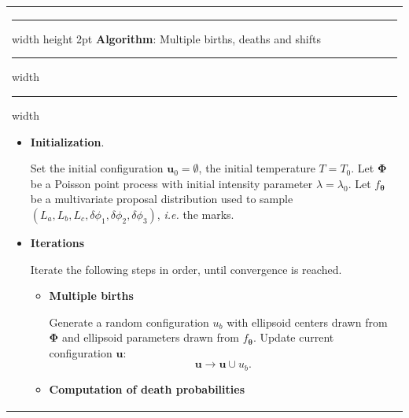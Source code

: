 \documentclass[journal]{IEEEtran}
\begin{document}
\begin{table}[!htb]
  \captionsetup{labelsep=none,labelformat=empty}
  \begin{center}
    \begin{tabular}{ m{8.8cm} }

      \hrule width \hsize height 2pt \vspace{0.3em}
      \textbf{Algorithm}: Multiple births, deaths and shifts
      \vspace{0.3em} \hrule width \hsize \kern 0.5mm \hrule width
      \hsize
      \vspace{0.5em}

      \begin{itemize}
        [leftmargin=*,noitemsep,topsep=3pt,parsep=0pt,partopsep=0pt]

      \item \textbf{Initialization}.

        Set the initial configuration $\mathbf{u}_0 = \emptyset$, the
        initial temperature $T = T_0$. Let $\mathbf{\Phi}$ be a
        Poisson point process with initial intensity parameter
        $\lambda = \lambda_0$. Let $f_{\boldsymbol{\theta}}$ be a
        multivariate proposal distribution used to sample
        $ \left( L_a, L_b, L_c, \delta{\phi_1}, \delta{\phi_2},
          \delta{\phi_3} \right)$, \textit{i.e.} the marks.

      \item \textbf{Iterations}

        Iterate the following steps in order, until convergence is
        reached.

        \begin{itemize}
          [leftmargin=*,noitemsep,topsep=3pt,parsep=0pt,partopsep=0pt]

        \item \textbf{Multiple births}

          Generate a random configuration $u_b$ with ellipsoid centers
          drawn from $\mathbf{\Phi}$ and ellipsoid parameters drawn
          from $f_{\boldsymbol{\theta}}$. Update current configuration
          $\mathbf{u}$:
          \begin{equation}
            \label{eq:mbds-update}
            \mathbf{u} \rightarrow \mathbf{u} \cup u_b.
          \end{equation}

        \item \textbf{Computation of death probabilities}


\end{itemize}
\end{itemize}
\end{tabular}
\end{center}
\end{table}
\end{document}
